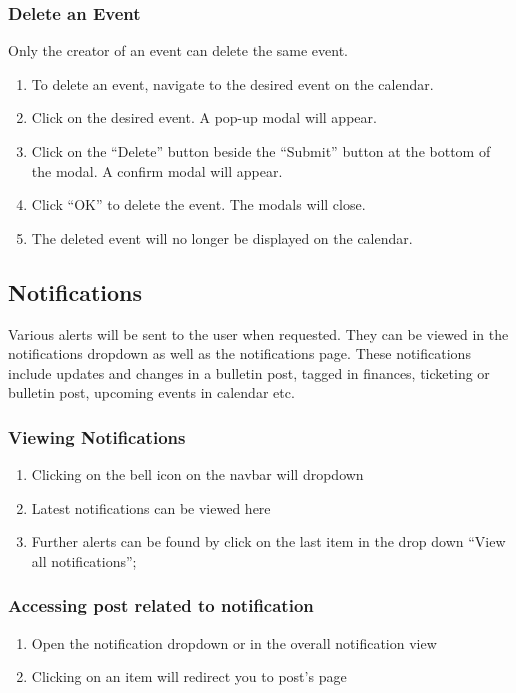 \documentclass[12pt]{article}
\begin{document}
    \subsubsection{Delete an Event}
    Only the creator of an event can delete the same event.
    \begin{enumerate}
        \item To delete an event, navigate to the desired event on the calendar.
        \item Click on the desired event. A pop-up modal will appear.
        \item Click on the ``Delete'' button beside the ``Submit'' button at the bottom of the modal.  A confirm modal will appear.
        \item Click ``OK'' to delete the event. The modals will close.
        \item The deleted event will no longer be displayed on the calendar.
    \end{enumerate}

    \subsection{Notifications}
    Various alerts will be sent to the user when requested. They can be viewed in the notifications dropdown as well as the notifications page.
    These notifications include updates and changes in a bulletin post, tagged in finances, ticketing or bulletin post, upcoming events in calendar etc.
    \subsubsection{Viewing Notifications}
    \begin{enumerate}
        \item Clicking on the bell icon on the navbar will dropdown
        \item Latest notifications can be viewed here
        \item Further alerts can be found by click on the last item in the drop down ``View all notifications'';
    \end{enumerate}
    \subsubsection{Accessing post related to notification}
    \begin{enumerate}
        \item Open the notification dropdown or in the overall notification view
        \item Clicking on an item will redirect you to post's page
    \end{enumerate}
\end{document}
